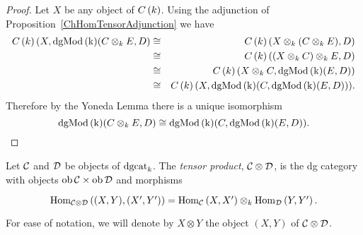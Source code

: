 \documentclass[dissertation.tex]{subfiles}
\begin{document}
\begin{eg}
\begin{description}[style=nextline]
\begin{prop}
      \begin{proof}
        Let $X$ be any object of $C\left(k\right)$.
        Using the adjunction of Proposition~\ref{ChHomTensorAdjunction} we have
        \begin{eqnarray*}
          C\left(k\right)(X,\operatorname{dgMod\left(k\right)}(C \otimes_k E, D) &\cong& 
          C\left(k\right)(X \otimes_k (C \otimes_k E), D)\\
          &\cong& C\left(k\right)((X \otimes_k C) \otimes_k E, D)\\
          &\cong& C\left(k\right)(X \otimes_k C, \operatorname{dgMod\left(k\right)}(E,D))\\
          &\cong& C\left(k\right)(X, \operatorname{dgMod\left(k\right)}(C, \operatorname{dgMod\left(k\right)}(E,D))).
        \end{eqnarray*}
        Therefore by the Yoneda Lemma there is a unique isomorphism 
        $$\operatorname{dgMod\left(k\right)}(C \otimes_k E, D) \cong \operatorname{dgMod\left(k\right)}(C, \operatorname{dgMod\left(k\right)}(E,D)).$$
      \end{proof}
    \end{prop}
  \end{description}
\end{eg}

\begin{defn}
  Let $\mathcal{C}$ and $\mathcal{D}$ be objects of $\operatorname{dgcat}_k$.
  The {\it tensor product}, $\mathcal{C} \otimes \mathcal{D}$, is the dg category with objects $\operatorname{ob}\mathcal{C} \times \operatorname{ob}\mathcal{D}$ and
  morphisms
  $$\begin{tikzcd}
    \Hom{\C \otimes \D}{(X, Y), (X^\prime, Y^\prime)} = \Hom{\C}{X,X^\prime} \otimes_k \Hom{\D}{Y,Y^\prime}.
  \end{tikzcd}$$
  For ease of notation, we will denote by $X \otimes Y$ the object $(X,Y)$ of $\mathcal{C} \otimes \mathcal{D}$.
\end{defn}
\end{document}
